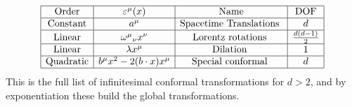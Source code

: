 \documentclass{article}
\begin{document}
\begin{equation}
\begin{array}{|c|c|c|c|}
\hline
\text{Order} & \varepsilon^\mu(x) & \text{Name} & \text{DOF} \\
\hline
\text{Constant} & a^\mu & \text{Spacetime Translations } & d \\
\hline
\text{Linear} & \omega^\mu{}_{\nu} x^\nu & \text{Lorentz rotations } & \frac{d(d-1)}{2} \\
\hline
\text{Linear} & \lambda x^\mu & \text{Dilation } & 1 \\
\hline
\text{Quadratic} & b^\mu x^2 - 2(b\cdot x)x^\mu & \text{Special conformal } & d \\
\hline
\end{array}
\end{equation}
This is the full list of infinitesimal conformal transformations for $d> 2$, and by exponentiation these build the global transformations. 
\end{document}
